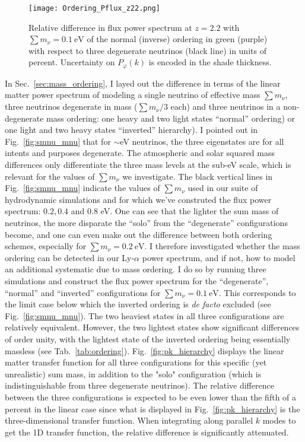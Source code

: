 \begin{figure}
\begin{center}
\texttt{[image: Ordering\_Pflux\_z22.png]}
\caption{Relative difference in flux power spectrum at $z=2.2$ with $\sum m_\nu = 0.1~\mathrm{eV}$ of the normal (inverse) ordering in green (purple) with respect to three degenerate neutrinos (black line) in units of percent. Uncertainty on $P_\varphi (k)$ is encoded in the shade thickness.}
\label{fig:flux_ordering}
\end{center}
\end{figure}

In Sec.~\ref{sec:mass_ordering}, I layed out the difference in terms of the linear matter power spectrum of modeling a single neutrino of effective mass $\sum m_\nu$, three neutrinos degenerate in mass ($\sum m_\nu / 3$ each) and three neutrinos in a non-degenerate mass ordering: one heavy and two light states ``normal'' ordering) or one light and two heavy states ``inverted'' hierarchy). I pointed out in Fig.~\ref{fig:smnu_mnu} that for $\sim$eV neutrinos, the three eigenstates are for all intents and purposes degenerate. The atmospheric and solar squared mass differences only differentiate the three mass levels at the sub-eV scale, which is relevant for the values of $\sum m_\nu$ we investigate. The black vertical lines in Fig.~\ref{fig:smnu_mnu} indicate the values of $\sum m_\nu$ used in our suite of hydrodynamic simulations and for which we've construted the flux power spectrum: $0.2, 0.4$ and $0.8$ eV. One can see that the lighter the sum mass of neutrinos, the more disparate the ``solo'' from the ``degenerate'' configurations become, and one can even make out the difference between both ordering schemes, especially for $\sum m_\nu = 0.2~\mathrm{eV}$. I therefore investigated whether the mass ordering can be detected in our Ly-$\alpha$ power spectrum, and if not, how to model an additional systematic due to mass ordering. I do so by running three simulations and construct the flux power spectrum for the ``degenerate'', ``normal'' and ``inverted'' configurations for $\sum m_\nu = 0.1~\mathrm{eV}$. This corresponds to the limit case below which the inverted ordering is \textit{de facto} excluded (see Fig.~\ref{fig:smnu_mnu}). The two heaviest states in all three configurations are relatively equivalent. However, the two lightest states show significant differences of order unity, with the lightest state of the inverted ordering being essentially massless (see Tab.~\ref{tab:ordering}). Fig.~\ref{fig:pk_hierarchy} displays the linear matter transfer function for all three configurations for this specific (yet unrealistic) sum mass, in addition to the "solo" configuration (which is indistinguishable from three degenerate neutrinos). The relative difference between the three configurations is expected to be even lower than the fifth of a percent in the linear case since what is displayed in Fig.~\ref{fig:pk_hierarchy} is the three-dimensional transfer function. When integrating along parallel $k$ modes to get the 1D transfer function, the relative difference is significantly attenuated. \\


